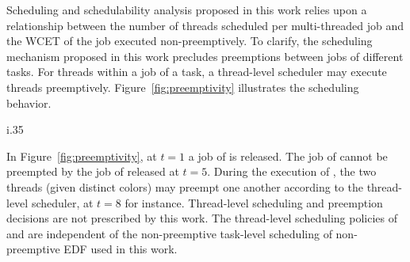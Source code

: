 Scheduling and schedulability analysis proposed in this work relies upon
a relationship between the number of threads scheduled per
multi-threaded job and the WCET of the job executed
non-preemptively. To clarify, the scheduling mechanism proposed in
this work precludes preemptions between jobs of different tasks. For
threads within a job of a task, a thread-level scheduler may execute
threads preemptively. Figure~\ref{fig:preemptivity} illustrates the
scheduling behavior.

\begin{wrapfigure}[7]{i}{.35\linewidth}
  \centering
  
  \caption{Scheduling Behavior}
  \label{fig:preemptivity}
\end{wrapfigure}

In Figure~\ref{fig:preemptivity}, at ${t = 1}$ a job of  is
released. The job of  cannot be preempted by the job of  
released at ${t = 5}$. During the execution of , the two
threads (given distinct colors) may preempt one another according to
the thread-level scheduler, at ${t = 8}$ for instance. Thread-level
scheduling and preemption decisions are not prescribed by this
work. The thread-level scheduling policies of  and 
are independent of the non-preemptive task-level scheduling of
non-preemptive EDF used in this work. 
